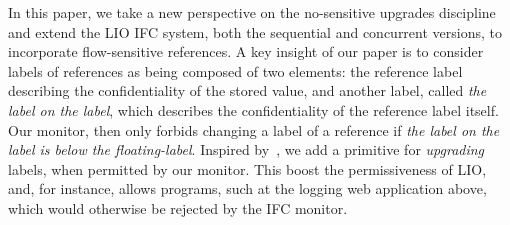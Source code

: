 
In this paper, we take a new perspective on the no-sensitive
upgrades discipline and extend the LIO IFC system, both the sequential
and concurrent versions, to incorporate flow-sensitive references.
%
A key insight of our paper is to consider labels of references as
being composed of two elements: the reference label describing the
confidentiality of the stored value, and another label, called
\emph{the label on the label}, which describes the confidentiality of
the reference label itself.
%
Our monitor, then only forbids changing a label of a reference if
\emph{the label on the label is below the floating-label}.
%
Inspired by~\cite{Hedin13}, we add
a primitive for \emph{upgrading} labels, when permitted by our
monitor.
%
This boost the permissiveness of LIO, and, for instance, allows
programs, such at the logging web application above, which would
otherwise be rejected by the IFC monitor.

